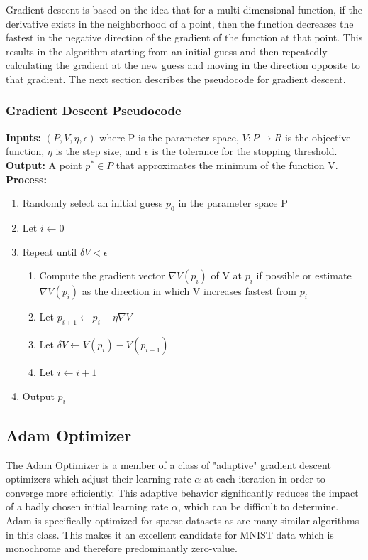 \documentclass[10pt,twocolumn]{article}
\begin{document}
Gradient descent is based on the idea that for a multi-dimensional function, if the derivative exists in the neighborhood of a point, then the function decreases the fastest in the negative direction of the gradient of the function  at that point. This results in the algorithm starting from an initial guess and then repeatedly calculating the gradient at the new guess and moving in the direction opposite to that gradient. The next section describes the pseudocode for gradient descent. 

\subsubsection{Gradient Descent Pseudocode}

\textbf{Inputs:} $(P,V,\eta,\epsilon)$ where P is the parameter space, $V:P \rightarrow R$ is the objective function, $\eta$ is the step size, and $\epsilon$ is the tolerance for the stopping threshold. \\
\textbf{Output:} A point $p^*\in P$ that approximates the minimum of the function V.\\
\textbf{Process:}\\
\begin{enumerate}
\item Randomly select an initial guess $p_{0}$ in the parameter space P
\item Let $i\leftarrow 0$
\item Repeat until $\delta{V} < \epsilon$
	\begin{enumerate}[label=(\alph*)]
	\item Compute the gradient vector $\nabla{V(p_i)}$ of V at $p_{i}$ if possible or estimate $\nabla{V(p_i)}$ as the direction in which V increases fastest from $p_{i}$
	\item Let $p_{i+1} \leftarrow p_{i} - \eta\nabla{V}$
	\item Let $\delta{V}\leftarrow V(p_i) - V(p_{i+1})$
	\item Let $i \leftarrow i+1$
	\end{enumerate}
\item Output $p_{i}$
\end{enumerate}

\subsection{Adam Optimizer}

The Adam Optimizer\cite{kingma2014adam} is a member of a class of "adaptive" gradient descent optimizers which adjust their learning rate $\alpha$ at each iteration in order to converge more efficiently. This adaptive behavior significantly reduces the impact of a badly chosen initial learning rate $\alpha$, which can be difficult to determine. Adam is specifically optimized for sparse datasets as are many similar algorithms in this class. This makes it an excellent candidate for MNIST data which is monochrome and therefore predominantly zero-value. 
\end{document}
